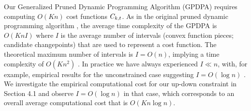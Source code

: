 \documentclass[aoas]{imsart}
\begin{document}
Our Generalized Pruned Dynamic Programming Algorithm (GPDPA) requires
computing $O(Kn)$ cost functions $C_{k,t}$. As in the original
pruned dynamic programming algorithm \citep{pruned-dp}, the average time
complexity of the GPDPA is $O(K n I)$ where $I$ is the average number of
intervals (convex function pieces; candidate changepoints) that are
used to represent a cost function. The theoretical maximum number of
intervals is $I=O(n)$, implying a time complexity of $O(K n^2)$
\citep{pruned-dp-new}.
In practice we have always experienced $I\ll n$, with, for example,
empirical results for the unconstrained case suggesting $I=O(\log
n)$ \citep{fpop}. We investigate the empirical computational cost for our up-down
constraint in Section 4.1 and observe $I=O(\log n)$ in that case,
which corresponds to an overall average computational cost that is
$O(Kn\log n)$.
\end{document}
